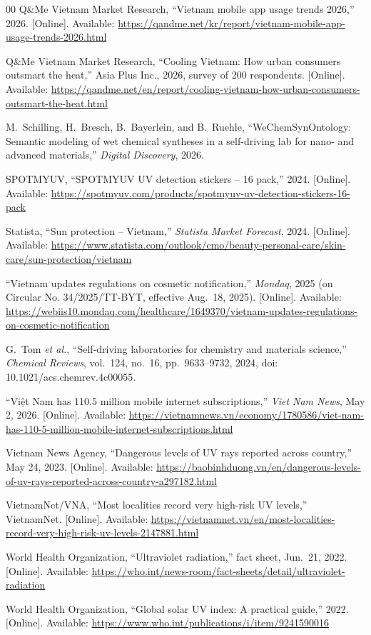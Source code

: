 \documentclass[12pt,a4paper]{article}
\numberwithin{table}{section}    %
\numberwithin{figure}{section}   %
\begin{document}
\begin{thebibliography}{00}
Q\&Me Vietnam Market Research, ``Vietnam mobile app usage trends 2026,'' 2026. [Online]. Available:
\url{https://qandme.net/kr/report/vietnam-mobile-app-usage-trends-2026.html}

Q\&Me Vietnam Market Research, ``Cooling Vietnam: How urban consumers outsmart the heat,'' Asia Plus Inc.,
2026, survey of 200 respondents. [Online]. Available:
\url{https://qandme.net/en/report/cooling-vietnam-how-urban-consumers-outsmart-the-heat.html}

M.~Schilling, H.~Bresch, B.~Bayerlein, and B.~Ruehle, ``WeChemSynOntology: Semantic modeling of wet chemical
syntheses in a self-driving lab for nano- and advanced materials,'' \emph{Digital Discovery}, 2026.

SPOTMYUV, ``SPOTMYUV UV detection stickers -- 16 pack,'' 2024. [Online]. Available:
\url{https://spotmyuv.com/products/spotmyuv-uv-detection-stickers-16-pack}

Statista, ``Sun protection -- Vietnam,'' \emph{Statista Market Forecast}, 2024. [Online]. Available:
\url{https://www.statista.com/outlook/cmo/beauty-personal-care/skin-care/sun-protection/vietnam}

``Vietnam updates regulations on cosmetic notification,'' \emph{Mondaq}, 2025 (on Circular No. 34/2025/TT-BYT,
effective Aug.~18, 2025). [Online]. Available:
\url{https://webiis10.mondaq.com/healthcare/1649370/vietnam-updates-regulations-on-cosmetic-notification}

G.~Tom \emph{et al.}, ``Self-driving laboratories for chemistry and materials science,''
\emph{Chemical Reviews}, vol.~124, no.~16, pp.~9633--9732, 2024, doi: 10.1021/acs.chemrev.4c00055.

``Vi\d{\^e}t Nam has 110.5 million mobile internet subscriptions,'' \emph{Viet Nam News}, May 2, 2026.
[Online]. Available:
\url{https://vietnamnews.vn/economy/1780586/viet-nam-has-110-5-million-mobile-internet-subscriptions.html}

Vietnam News Agency, ``Dangerous levels of UV rays reported across country,'' May 24, 2023. [Online]. Available:
\url{https://baobinhduong.vn/en/dangerous-levels-of-uv-rays-reported-across-country-a297182.html}

VietnamNet/VNA, ``Most localities record very high-risk UV levels,'' VietnamNet. [Online]. Available:
\url{https://vietnamnet.vn/en/most-localities-record-very-high-risk-uv-levels-2147881.html}

World Health Organization, ``Ultraviolet radiation,'' fact sheet, Jun.~21, 2022. [Online]. Available:
\url{https://who.int/news-room/fact-sheets/detail/ultraviolet-radiation}

World Health Organization, ``Global solar UV index: A practical guide,'' 2022. [Online]. Available:
\url{https://www.who.int/publications/i/item/9241590016}

\end{thebibliography}
\end{document}

